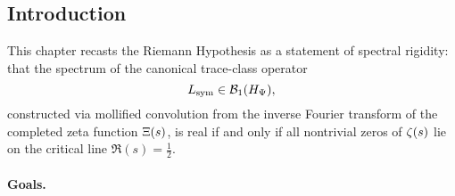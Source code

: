 \subsection*{Introduction}


This chapter recasts the Riemann Hypothesis as a statement of spectral rigidity: that the spectrum of the canonical trace-class operator
\[
L_{\mathrm{sym}} \in \mathcal{B}_1(H_{\Psi}),
\]
constructed via mollified convolution from the inverse Fourier transform of the completed zeta function \( \Xi(s) \), is real if and only if all nontrivial zeros of \( \zeta(s) \) lie on the critical line \( \Re(s) = \tfrac{1}{2} \).

\paragraph{Goals.}
